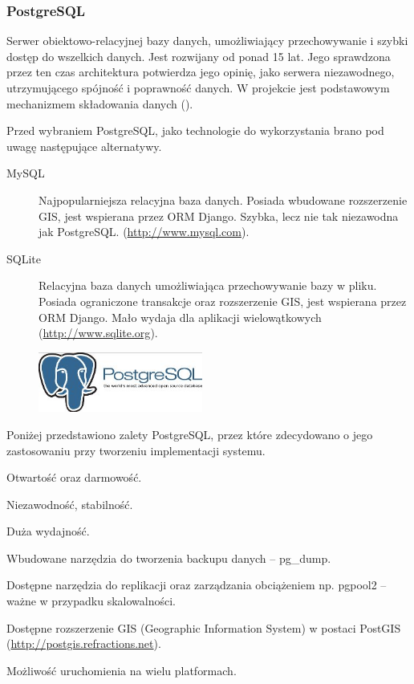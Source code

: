 \newpage
\subsubsection{PostgreSQL}
Serwer obiektowo-relacyjnej bazy danych, umożliwiający przechowywanie i szybki dostęp do wszelkich danych. Jest rozwijany od ponad 15 lat. Jego sprawdzona przez ten czas architektura potwierdza jego opinię, jako serwera niezawodnego, utrzymującego spójność i poprawność danych. W projekcie jest podstawowym mechanizmem składowania danych (\cite{PostgreSQL}).

Przed wybraniem PostgreSQL, jako technologie do wykorzystania brano pod uwagę następujące alternatywy.
\begin{description}
    \item[MySQL] Najpopularniejsza relacyjna baza danych. Posiada wbudowane rozszerzenie GIS, jest wspierana przez ORM Django. Szybka, lecz nie tak niezawodna jak PostgreSQL.  (\url{http://www.mysql.com}).
    \item[SQLite] Relacyjna baza danych umożliwiająca przechowywanie bazy w pliku. Posiada ograniczone transakcje oraz rozszerzenie GIS, jest wspierana przez ORM Django. Mało wydaja dla aplikacji wielowątkowych (\url{http://www.sqlite.org}).
\end{description}

\begin{figure}
  \begin{center}
    \includegraphics[width=0.48\textwidth]{img/logos/postgresql.jpg}
  \end{center}
\end{figure}

Poniżej przedstawiono zalety PostgreSQL, przez które zdecydowano o jego zastosowaniu przy tworzeniu implementacji systemu.
\begin{packed_item}
    \item{Otwartość oraz darmowość.}
    \item{Niezawodność, stabilność.}
    \item{Duża wydajność.}
    \item{Wbudowane narzędzia do tworzenia backupu danych -- pg\_dump.}
    \item{Dostępne narzędzia do replikacji oraz zarządzania obciążeniem np. pgpool2 -- ważne w przypadku skalowalności.}
    \item{Dostępne rozszerzenie GIS (Geographic Information System) w postaci PostGIS (\url{http://postgis.refractions.net}).}
    \item{Możliwość uruchomienia na wielu platformach.}
\end{packed_item}

